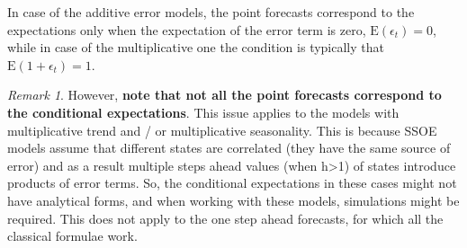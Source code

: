 \documentclass[
]{book}
\theoremstyle{definition}
\theoremstyle{definition}
\theoremstyle{definition}
\theoremstyle{definition}
\theoremstyle{remark}
\newtheorem*{remark}{Remark}
\begin{document}
In case of the additive error models, the point forecasts correspond to the expectations only when the expectation of the error term is zero, \(\text{E}(\epsilon_t)=0\), while in case of the multiplicative one the condition is typically that \(\text{E}(1+\epsilon_t)=1\).

\begin{remark}

However, \textbf{note that not all the point forecasts correspond to the conditional expectations}. This issue applies to the models with multiplicative trend and / or multiplicative seasonality. This is because SSOE models assume that different states are correlated (they have the same source of error) and as a result multiple steps ahead values (when h\textgreater1) of states introduce products of error terms. So, the conditional expectations in these cases might not have analytical forms, and when working with these models, simulations might be required. This does not apply to the one step ahead forecasts, for which all the classical formulae work.

\end{remark}
\end{document}
